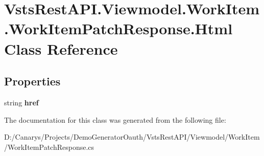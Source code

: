 \hypertarget{class_vsts_rest_a_p_i_1_1_viewmodel_1_1_work_item_1_1_work_item_patch_response_1_1_html}{}\section{Vsts\+Rest\+A\+P\+I.\+Viewmodel.\+Work\+Item.\+Work\+Item\+Patch\+Response.\+Html Class Reference}
\label{class_vsts_rest_a_p_i_1_1_viewmodel_1_1_work_item_1_1_work_item_patch_response_1_1_html}
\subsection*{Properties}
\begin{DoxyCompactItemize}
\item 
\mbox{\label{class_vsts_rest_a_p_i_1_1_viewmodel_1_1_work_item_1_1_work_item_patch_response_1_1_html_a6067d030830321b15bef015e8bdd223d}} 
string {\bfseries href}
\end{DoxyCompactItemize}


The documentation for this class was generated from the following file\+:\begin{DoxyCompactItemize}
\item 
D\+:/\+Canarys/\+Projects/\+Demo\+Generator\+Oauth/\+Vsts\+Rest\+A\+P\+I/\+Viewmodel/\+Work\+Item/Work\+Item\+Patch\+Response.\+cs\end{DoxyCompactItemize}
